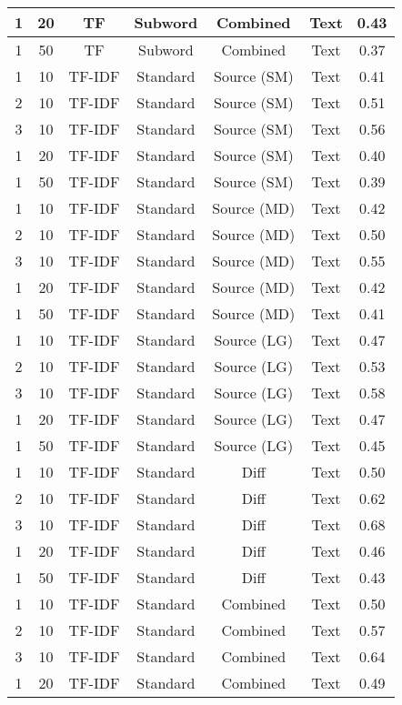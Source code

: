 \begin{longtable}{|c|c|c|c|c|c|c|}
\hline
1 & 20 & TF & Subword & Combined & Text & 0.43 \\
\hline
1 & 50 & TF & Subword & Combined & Text & 0.37 \\
\hline
1 & 10 & TF-IDF & Standard & Source (SM) & Text & 0.41 \\
\hline
2 & 10 & TF-IDF & Standard & Source (SM) & Text & 0.51 \\
\hline
3 & 10 & TF-IDF & Standard & Source (SM) & Text & 0.56 \\
\hline
1 & 20 & TF-IDF & Standard & Source (SM) & Text & 0.40 \\
\hline
1 & 50 & TF-IDF & Standard & Source (SM) & Text & 0.39 \\
\hline
1 & 10 & TF-IDF & Standard & Source (MD) & Text & 0.42 \\
\hline
2 & 10 & TF-IDF & Standard & Source (MD) & Text & 0.50 \\
\hline
3 & 10 & TF-IDF & Standard & Source (MD) & Text & 0.55 \\
\hline
1 & 20 & TF-IDF & Standard & Source (MD) & Text & 0.42 \\
\hline
1 & 50 & TF-IDF & Standard & Source (MD) & Text & 0.41 \\
\hline
1 & 10 & TF-IDF & Standard & Source (LG) & Text & 0.47 \\
\hline
2 & 10 & TF-IDF & Standard & Source (LG) & Text & 0.53 \\
\hline
3 & 10 & TF-IDF & Standard & Source (LG) & Text & 0.58 \\
\hline
1 & 20 & TF-IDF & Standard & Source (LG) & Text & 0.47 \\
\hline
1 & 50 & TF-IDF & Standard & Source (LG) & Text & 0.45 \\
\hline
1 & 10 & TF-IDF & Standard & Diff & Text & 0.50 \\
\hline
2 & 10 & TF-IDF & Standard & Diff & Text & 0.62 \\
\hline
3 & 10 & TF-IDF & Standard & Diff & Text & 0.68 \\
\hline
1 & 20 & TF-IDF & Standard & Diff & Text & 0.46 \\
\hline
1 & 50 & TF-IDF & Standard & Diff & Text & 0.43 \\
\hline
1 & 10 & TF-IDF & Standard & Combined & Text & 0.50 \\
\hline
2 & 10 & TF-IDF & Standard & Combined & Text & 0.57 \\
\hline
3 & 10 & TF-IDF & Standard & Combined & Text & 0.64 \\
\hline
1 & 20 & TF-IDF & Standard & Combined & Text & 0.49 \\

\end{longtable}
